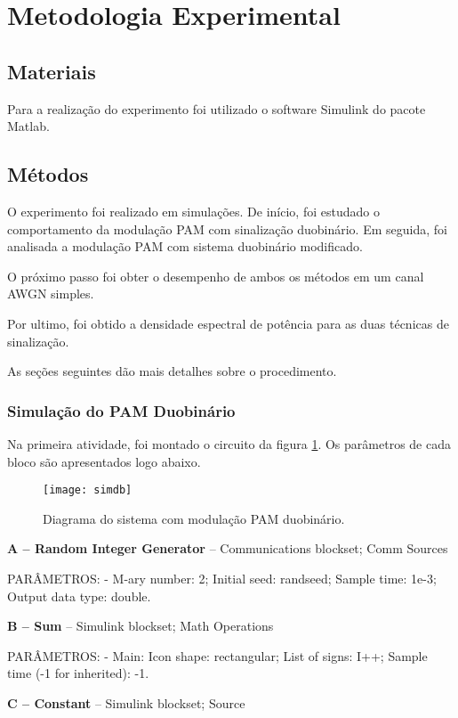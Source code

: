 \newpage
\section{Metodologia Experimental}

\subsection{Materiais}

Para a realização do experimento foi utilizado o software Simulink do pacote 
Matlab.

\subsection{Métodos}
O experimento foi realizado em simulações. De início, foi estudado o 
comportamento da modulação PAM com sinalização duobinário. Em seguida, foi analisada a modulação PAM com sistema duobinário modificado.

O próximo passo foi obter o desempenho de ambos os métodos em um canal AWGN simples.

Por ultimo, foi obtido a densidade espectral de potência para as duas técnicas de sinalização.

As seções seguintes dão mais detalhes sobre o procedimento.

\subsubsection{Simulação do PAM Duobinário}
Na primeira atividade, foi montado o circuito da figura \ref{fig:simdb}. Os parâmetros de cada bloco são apresentados logo abaixo.

\begin{figure}[H]
    \centering
    \caption{Diagrama do sistema com modulação PAM duobinário.}
    \texttt{[image: simdb]}
    \label{fig:simdb}
\end{figure}
  
\textbf{A – Random Integer Generator} – Communications blockset; Comm Sources

PARÂMETROS: - M-ary number: 2; Initial seed: randseed; Sample time: 1e-3; Output data type: double.

\textbf{B – Sum} – Simulink blockset; Math Operations

PARÂMETROS: - Main: Icon shape: rectangular; List of signs: I++; Sample time (-1 for inherited): -1.

\textbf{C – Constant} – Simulink blockset; Source

